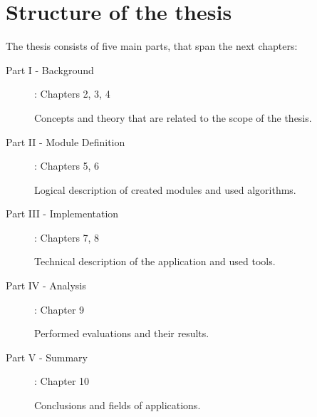 \pagebreak

\section{Structure of the thesis} 

The thesis consists of five main parts, that span the next chapters: 

\begin{description}
    \item[Part I - Background]: Chapters 2, 3, 4
    
    Concepts and theory that are related to the scope of the thesis.
    
    \item[Part II - Module Definition]: Chapters 5, 6

    Logical description of created modules and used algorithms.
    
    \item[Part III - Implementation]: Chapters 7, 8

    Technical description of the application and used tools.
    
    \item[Part IV - Analysis]: Chapter 9
    
    Performed evaluations and their results.
    
    \item[Part V - Summary]: Chapter 10
    
    Conclusions and fields of applications.
    
\end{description}

